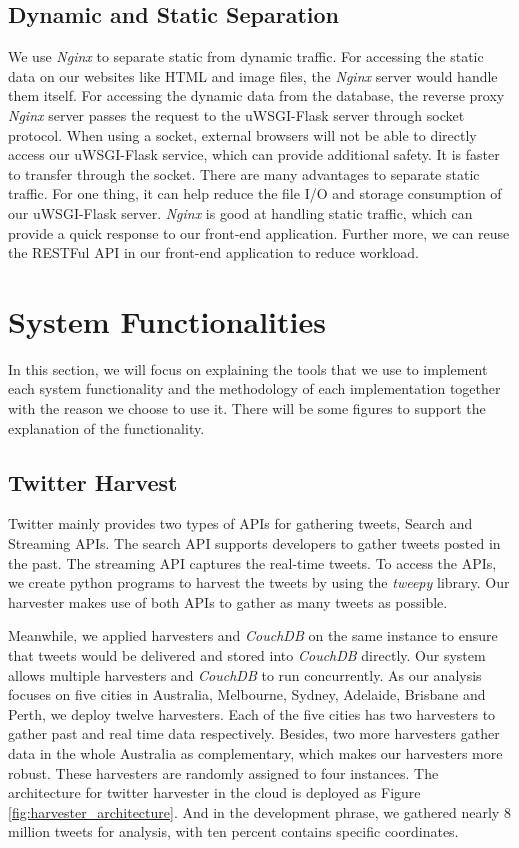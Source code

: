 \documentclass{article}
\begin{document}
\subsection{Dynamic and Static Separation}
We use \textit{Nginx} to separate static from dynamic traffic. For accessing the static data on our websites like HTML and image files, the \textit{Nginx} server would handle them itself. For accessing the dynamic data from the database, the reverse proxy \textit{Nginx} server passes the request to the uWSGI-Flask server through socket protocol. When using a socket, external browsers will not be able to directly access our uWSGI-Flask service, which can provide additional safety. It is faster to transfer through the socket. There are many advantages to separate static traffic. For one thing, it can help reduce the file I/O and storage consumption of our uWSGI-Flask server. \textit{Nginx} is good at handling static traffic, which can provide a quick response to our front-end application. Further more, we can reuse the RESTFul API in our front-end application to reduce workload.



\section{System Functionalities}
In this section, we will focus on explaining the tools that we use to implement each system functionality and the methodology of each implementation together with the reason we choose to use it. There will be some figures to support the explanation of the functionality.
\subsection{Twitter Harvest}
Twitter mainly provides two types of APIs for gathering tweets, Search and Streaming APIs. The search API supports developers to gather tweets posted in the past. The streaming API captures the real-time tweets. To access the APIs, we create python programs to harvest the tweets by using the \textit{tweepy} library. Our harvester makes use of both APIs to gather as many tweets as possible.

Meanwhile, we applied harvesters and \textit{CouchDB} on the same instance to ensure that tweets would be delivered and stored into \textit{CouchDB} directly. Our system allows multiple harvesters and \textit{CouchDB} to run concurrently. As our analysis focuses on five cities in Australia, Melbourne, Sydney, Adelaide, Brisbane and Perth, we deploy twelve harvesters. Each of the five cities has two harvesters to gather past and real time data respectively. Besides, two more harvesters gather data in the whole Australia as complementary, which makes our harvesters more robust. These harvesters are randomly assigned to four instances. The architecture for twitter harvester in the cloud is deployed as Figure
\ref{fig:harvester_architecture}. And in the development phrase, we gathered nearly 8 million tweets for analysis, with ten percent contains specific coordinates.
\end{document}
